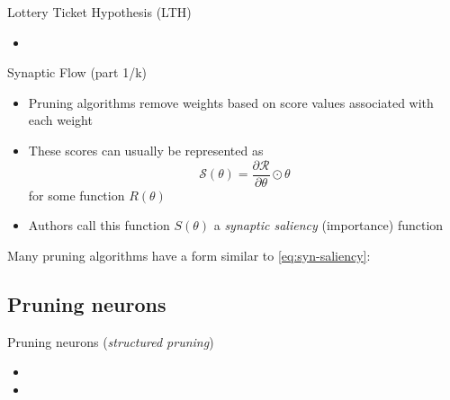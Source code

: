 \documentclass[10pt, handout]{beamer}
\begin{document}
\begin{frame}{Lottery Ticket Hypothesis (LTH)}
    \begin{itemize}
        \item 
    \end{itemize}
\end{frame}


\begin{frame}{Synaptic Flow \cite{SynFlow} (part 1/k)}
    \begin{itemize}
        \item\pause Pruning algorithms remove weights based on score values associated with each weight
        \item\pause These scores can usually be represented as
    \begin{equation}\label{eq:syn-saliency}
        \mathcal{S}(\theta)=\frac{\partial \mathcal{R}}{\partial \theta} \odot \theta
    \end{equation}
    for some function $R(\theta)$
        \item\pause Authors call this function $S(\theta)$ a \textit{synaptic saliency} (importance) function
    \end{itemize}
\end{frame}


\begin{frame}
\pause Many pruning algorithms have a form similar to \eqref{eq:syn-saliency}:
\end{frame}


\subsection{Pruning neurons}
\begin{frame}{Pruning neurons (\textit{structured pruning})}
    \begin{itemize}
        \item 
        \item 
    \end{itemize}
\end{frame}
\end{document}
